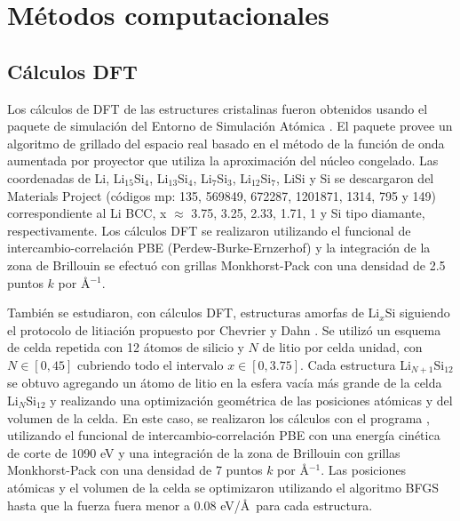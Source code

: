 \section{Métodos computacionales}

\subsection{Cálculos DFT}\label{s:dftcalc}

Los cálculos de DFT de las estructures cristalinas fueron obtenidos usando el 
paquete de simulación  \cite{enkovaara2010, mortensen2005} del 
Entorno de Simulación Atómica \cite{larsen2017}. El paquete  provee un 
algoritmo de grillado del espacio real basado en el método de la función de onda 
aumentada por proyector \cite{blochl1994} que utiliza la aproximación del núcleo 
congelado. Las coordenadas de Li, Li$_{15}$Si$_{4}$, Li$_{13}$Si$_{4}$, 
Li$_{7}$Si$_{3}$, Li$_{12}$Si$_{7}$, LiSi y Si se descargaron del Materials 
Project \cite{materials_project} (códigos mp: 135, 569849, 672287, 1201871, 1314, 
795 y 149) correspondiente al Li BCC, x $\approx$ 3.75, 3.25, 2.33, 1.71, 1 y
Si tipo diamante, respectivamente. Los cálculos DFT se realizaron utilizando el 
funcional de intercambio-correlación PBE (Perdew-Burke-Ernzerhof) y la integración
de la zona de Brillouin se efectuó con grillas Monkhorst-Pack con una densidad
de 2.5 puntos $k$ por \AA$^{-1}$.

También se estudiaron, con cálculos DFT, estructuras amorfas de Li$_x$Si siguiendo
el protocolo de litiación propuesto por Chevrier y Dahn \cite{chevrier2009, 
chevrier2010}. Se utilizó un esquema de celda repetida con 12 átomos de silicio y 
$N$ de litio por celda unidad, con $N\in[0,45]$ cubriendo todo el intervalo 
$x\in[0,3.75]$. Cada estructura Li$_{N+1}$Si$_{12}$ se obtuvo agregando un átomo 
de litio en la esfera vacía más grande de la celda Li$_{N}$Si$_{12}$ y realizando
una optimización geométrica de las posiciones atómicas y del volumen de la celda.
En este caso, se realizaron los cálculos con el programa  
 \cite{quantum_espresso,quantum_espresso_advanced}, utilizando el 
funcional de intercambio-correlación PBE con una energía cinética de corte de 
1090 eV y una integración de la zona de Brillouin con grillas Monkhorst-Pack con 
una densidad de 7 puntos $k$ por \AA$^{-1}$. Las posiciones atómicas y el volumen 
de la celda se optimizaron utilizando el algoritmo BFGS hasta que la fuerza fuera 
menor a 0.08 eV/\AA\ para cada estructura.



